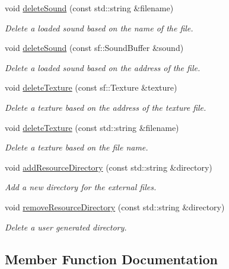 \begin{DoxyCompactItemize}
void \hyperlink{class_resource_manager_a8203e72ff90185317afb3de075c3a687}{delete\+Sound} (const std\+::string \&filename)
\begin{DoxyCompactList}\small\item\em Delete a loaded sound based on the name of the file. \end{DoxyCompactList}\item 
void \hyperlink{class_resource_manager_a77f65cbaa94708fd7a5a17e5991dc22d}{delete\+Sound} (const sf\+::\+Sound\+Buffer \&sound)
\begin{DoxyCompactList}\small\item\em Delete a loaded sound based on the address of the file. \end{DoxyCompactList}\item 
void \hyperlink{class_resource_manager_a7c2f6f0c696844f4e425a38d34b06cee}{delete\+Texture} (const sf\+::\+Texture \&texture)
\begin{DoxyCompactList}\small\item\em Delete a texture based on the address of the texture file. \end{DoxyCompactList}\item 
void \hyperlink{class_resource_manager_a35dd2d508c5170c929b045b8f5b75c10}{delete\+Texture} (const std\+::string \&filename)
\begin{DoxyCompactList}\small\item\em Delete a texture based on the file name. \end{DoxyCompactList}\item 
void \hyperlink{class_resource_manager_aed7bd28f1f13ec392eac7d8d5dd39d6f}{add\+Resource\+Directory} (const std\+::string \&directory)
\begin{DoxyCompactList}\small\item\em Add a new directory for the external files. \end{DoxyCompactList}\item 
void \hyperlink{class_resource_manager_a38fde2e7c5145472f504a6abb06d7a23}{remove\+Resource\+Directory} (const std\+::string \&directory)
\begin{DoxyCompactList}\small\item\em Delete a user generated directory. \end{DoxyCompactList}\end{DoxyCompactItemize}


\subsection{Member Function Documentation}
\mbox{\label{class_resource_manager_aed7bd28f1f13ec392eac7d8d5dd39d6f}} 
